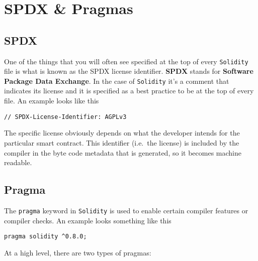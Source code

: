 \section{SPDX \& Pragmas}\label{spdx-pragmas}

\subsection{SPDX}\label{spdx}

One of the things that you will often see specified at the top of every
\texttt{Solidity} file is what is known as the SPDX license identifier.
\textbf{SPDX} stands for \textbf{Software Package Data Exchange}. In the
case of \texttt{Solidity} it's a comment that indicates its license and
it is specified as a best practice to be at the top of every file. An
example looks like this

\begin{lstlisting}[language=Solidity,numbers=none]
// SPDX-License-Identifier: AGPLv3
\end{lstlisting}

The specific license obviously depends on what the developer intends for
the particular smart contract. This identifier (i.e.~the license) is
included by the compiler in the byte code metadata that is generated, so
it becomes machine readable.

\subsection{Pragma}\label{pragma}

The \texttt{pragma} keyword in \texttt{Solidity} is used to enable
certain compiler features or compiler checks. An example looks something
like this

\begin{lstlisting}[language=Solidity,numbers=none]
pragma solidity ^0.8.0;
\end{lstlisting}

At a high level, there are two types of pragmas:

